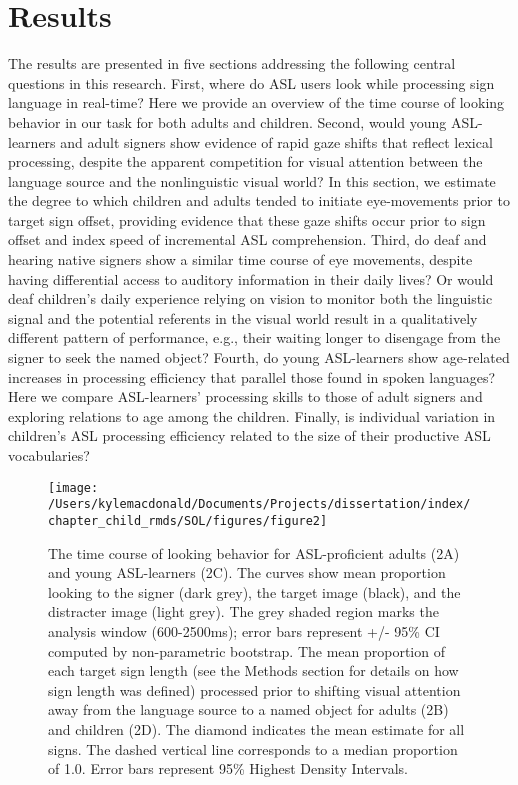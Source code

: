 \documentclass[oneside]{report}
\begin{document}
\section{Results}\label{results}

The results are presented in five sections addressing the following
central questions in this research. First, where do ASL users look while
processing sign language in real-time? Here we provide an overview of
the time course of looking behavior in our task for both adults and
children. Second, would young ASL-learners and adult signers show
evidence of rapid gaze shifts that reflect lexical processing, despite
the apparent competition for visual attention between the language
source and the nonlinguistic visual world? In this section, we estimate
the degree to which children and adults tended to initiate eye-movements
prior to target sign offset, providing evidence that these gaze shifts
occur prior to sign offset and index speed of incremental ASL
comprehension. Third, do deaf and hearing native signers show a similar
time course of eye movements, despite having differential access to
auditory information in their daily lives? Or would deaf children's
daily experience relying on vision to monitor both the linguistic signal
and the potential referents in the visual world result in a
qualitatively different pattern of performance, e.g., their waiting
longer to disengage from the signer to seek the named object? Fourth, do
young ASL-learners show age-related increases in processing efficiency
that parallel those found in spoken languages? Here we compare
ASL-learners' processing skills to those of adult signers and exploring
relations to age among the children. Finally, is individual variation in
children's ASL processing efficiency related to the size of their
productive ASL vocabularies?
\begin{figure}[t]

{\centering \texttt{[image: /Users/kylemacdonald/Documents/Projects/dissertation/index/chapter\_child\_rmds/SOL/figures/figure2]} 

}

\caption[Time course looking behavior for ASL-proficient adults and young ASL-learners]{The time course of looking behavior for ASL-proficient adults (2A) and young ASL-learners (2C). The curves show mean proportion looking to the signer (dark grey), the target image (black), and the distracter image (light grey). The grey shaded region marks the analysis window (600-2500ms); error bars represent +/- 95\% CI computed by non-parametric bootstrap. The mean proportion of each target sign length (see the Methods section for details on how sign length was defined) processed prior to shifting visual attention away from the language source to a named object for adults (2B) and children (2D). The diamond indicates the mean estimate for all signs. The dashed vertical line corresponds to a median proportion of 1.0. Error bars represent 95\% Highest Density Intervals.}\label{fig:sol-tc-figure}
\end{figure}
\end{document}
